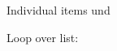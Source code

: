 \documentclass{article}
\begin{document}
\setsepchar{-}
\readlist\mylist{\jobname}

Individual items \mylist[1] und \mylist[2]

Loop over list:
\foreachitem\x\in{}

\mylistlen

\showitems*\mylist
\end{document}

